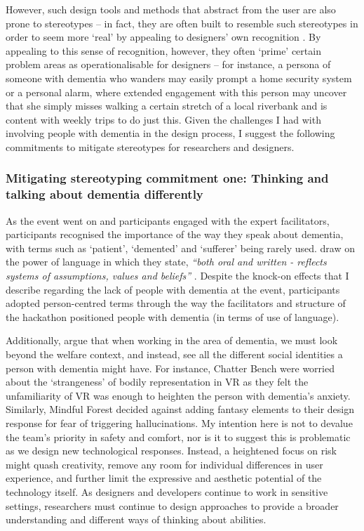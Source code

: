 However, such design tools and methods that abstract from the user are also prone to stereotypes – in fact, they are often built to resemble such stereotypes in order to seem more `real' by appealing to designers’ own recognition \citep{cutting_can_2019}. By appealing to this sense of recognition, however, they often `prime' certain problem areas as operationalisable for designers – for instance, a persona of someone with dementia who wanders may easily prompt a home security system or a personal alarm, where extended engagement with this person may uncover that she simply misses walking a certain stretch of a local riverbank and is content with weekly trips to do just this. Given the challenges I had with involving people with dementia in the design process, I suggest the following commitments to mitigate stereotypes for researchers and designers.

\subsubsection{Mitigating stereotyping commitment one: Thinking and talking about dementia differently}
\label{DiscussionOne:CommitTwo}
As the event went on and participants engaged with the expert facilitators, participants recognised the importance of the way they speak about dementia, with terms such as `patient', `demented' and `sufferer' being rarely used. \cite{bartlett2010broadening} draw on the power of language in which they state, \textit{``both oral and written - reflects systems of assumptions, values and beliefs''} \citep[pg.52]{bartlett2010broadening}. Despite the knock-on effects that I describe regarding the lack of people with dementia at the event, participants adopted person-centred terms through the way the facilitators and structure of the hackathon positioned people with dementia (in terms of use of language).

Additionally, \cite{bartlett2010broadening} argue that when working in the area of dementia, we must look beyond the welfare context, and instead, see all the different social identities a person with dementia might have. For instance, Chatter Bench were worried about the `strangeness' of bodily representation in VR as they felt the unfamiliarity of VR was enough to heighten the person with dementia's anxiety. Similarly, Mindful Forest decided against adding fantasy elements to their design response for fear of triggering hallucinations. My intention here is not to devalue the team's priority in safety and comfort, nor is it to suggest this is problematic as we design new technological responses. Instead, a heightened focus on risk might quash creativity, remove any room for individual differences in user experience, and further limit the expressive and aesthetic potential of the technology itself. As designers and developers continue to work in sensitive settings, researchers must continue to design approaches to provide a broader understanding and different ways of thinking about abilities. 

